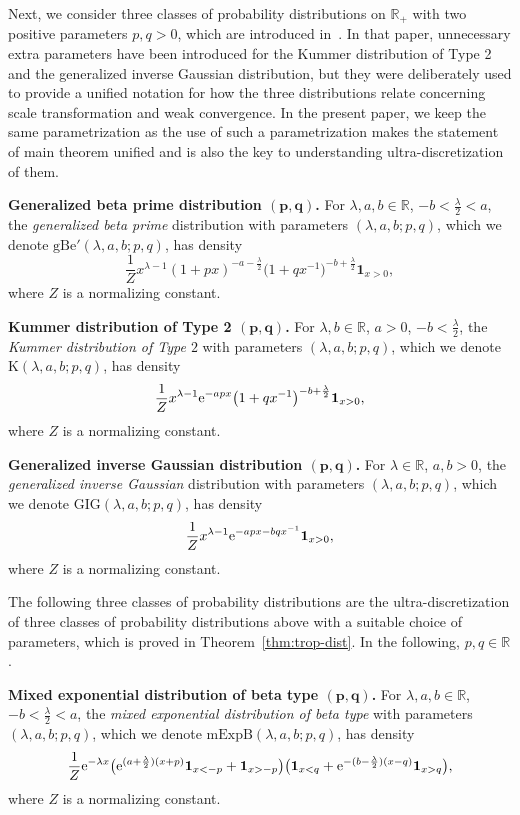 \documentclass[pdftex]{sigma}
\numberwithin{equation}{section}
\def\R{\mathbb{R}}
\newcommand{\la}{\lambda}
\begin{document}
Next, we consider three classes of probability distributions on $\R_+$ with two positive parameters $p, q >0$, which are introduced in~\cite{SU}. In that paper, unnecessary extra parameters have been introduced for the Kummer distribution of Type 2 and the generalized inverse Gaussian distribution, but they were deliberately used to provide a unified notation for how the three distributions relate concerning scale transformation and weak convergence. In the present paper, we keep the same parametrization as the use of such a parametrization makes the statement of main theorem unified and is also the key to understanding ultra-discretization of them.

{\bf Generalized beta prime distribution $\boldsymbol{(p, q)}$.} For $\lambda, a,b \in \R$, $-b < \frac{\lambda}{2} < a$, the \emph{generalized beta prime} distribution with parameters $(\lambda,a,b ; p, q)$, which we denote $\mathrm{gBe}'(\lambda,a,b ; p, q)$, has density
\[\frac{1}{Z} x^{\lambda-1} (1+p x)^{-a-\frac{\lambda}{2}} \bigl(1+q x^{-1}\bigr)^{-b+\frac{\lambda}{2}}\mathbf{1}_{x >0},\]
where $Z$ is a normalizing constant.

{\bf Kummer distribution of Type 2 $\boldsymbol{(p, q)}$.} For $\lambda,b \in \R$, $a >0$, $-b < \frac{\lambda}{2}$, the \emph{Kummer distribution of Type $2$} with parameters $(\lambda,a,b ; p, q)$, which we denote $\mathrm{K} (\lambda,a,b ; p, q)$, has density
\[\frac{1}{Z} x^{\lambda-1}{\rm e}^{-a p x} \bigl(1+q x^{-1}\bigr)^{-b+\frac{\lambda}{2}}\mathbf{1}_{x >0},\]
where $Z$ is a normalizing constant.

{\bf Generalized inverse Gaussian distribution $\boldsymbol{(p, q)}$.} For $\lambda \in \R$, $a,b >0$, the \emph{generalized inverse Gaussian} distribution with parameters $(\lambda,a,b ; p, q)$, which we denote $\mathrm{GIG} (\lambda,a,b ; p, q)$, has density
\[\frac{1}{Z}x^{\lambda-1}{\rm e}^{-a p x-bq x^{-1}}\mathbf{1}_{x >0},\]
where $Z$ is a normalizing constant.

The following three classes of probability distributions are
the ultra-discretization of three classes of probability distributions above with a suitable choice of parameters, which is proved in Theorem~\ref{thm:trop-dist}. In the following, $p, q \in \R$.


{\bf Mixed exponential distribution of beta type $\boldsymbol{(p, q)}$.} For $\lambda, a,b \in \R$, $-b < \frac{\lambda}{2} < a$, the \emph{mixed exponential distribution of beta type} with parameters $(\lambda,a,b ; p, q)$, which we denote $\mathrm{mExpB} (\lambda,a,b ; p, q)$, has density
\[\frac{1}{Z}{\rm e}^{-\lambda x} \bigl({\rm e}^{(a+\frac{\la}{2})(x+p)}\mathbf{1}_{x < -p}+\mathbf{1}_{x > -p}\bigr) \bigl(\mathbf{1}_{x < q}+{\rm e}^{-(b-\frac{\la}{2})(x-q)}\mathbf{1}_{x > q} \bigr) ,\]
where $Z$ is a normalizing constant.
\end{document}
